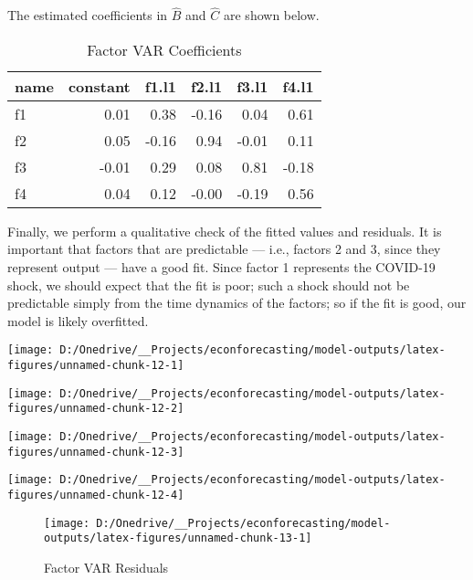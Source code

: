 \documentclass[11pt, letterpaper]{article}\usepackage[]{graphicx}\usepackage[]{color}
\begin{document}
The estimated coefficients in $\widehat{B}$ and $\widehat{C}$ are shown below.
\begin{table}[H]
\centering
\begingroup\footnotesize
\begin{tabular}{lrrrrr}
  \hline
name & constant & f1.l1 & f2.l1 & f3.l1 & f4.l1 \\ 
  \hline
f1 & 0.01 & 0.38 & -0.16 & 0.04 & 0.61 \\ 
  f2 & 0.05 & -0.16 & 0.94 & -0.01 & 0.11 \\ 
  f3 & -0.01 & 0.29 & 0.08 & 0.81 & -0.18 \\ 
  f4 & 0.04 & 0.12 & -0.00 & -0.19 & 0.56 \\ 
   \hline
\end{tabular}
\endgroup
\caption{Factor VAR Coefficients} 
\end{table}



Finally, we perform a qualitative check of the fitted values and residuals. It is important that factors that are predictable --- i.e., factors 2 and 3, since they represent output --- have a good fit. Since factor 1 represents the COVID-19 shock, we should expect that the fit is poor; such a shock should not be predictable simply from the time dynamics of the factors; so if the fit is good, our model is likely overfitted.


{\centering \texttt{[image: D:/Onedrive/\_\_Projects/econforecasting/model-outputs/latex-figures/unnamed-chunk-12-1]} 

}




{\centering \texttt{[image: D:/Onedrive/\_\_Projects/econforecasting/model-outputs/latex-figures/unnamed-chunk-12-2]} 

}




{\centering \texttt{[image: D:/Onedrive/\_\_Projects/econforecasting/model-outputs/latex-figures/unnamed-chunk-12-3]} 

}




{\centering \texttt{[image: D:/Onedrive/\_\_Projects/econforecasting/model-outputs/latex-figures/unnamed-chunk-12-4]} 

}





\begin{figure}[H]

{\centering \texttt{[image: D:/Onedrive/\_\_Projects/econforecasting/model-outputs/latex-figures/unnamed-chunk-13-1]} 

}

\caption[Factor VAR Residuals]{Factor VAR Residuals}\label{fig:unnamed-chunk-13}
\end{figure}
\end{document}
